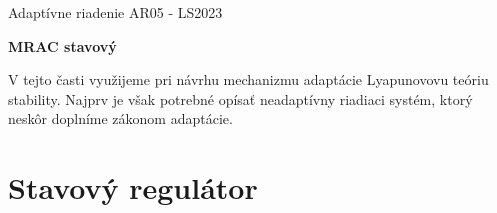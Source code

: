 \documentclass[a4paper, 10pt, ]{article}
\def\oznacenieCasti{AR05 - LS2023}
\begin{document}
\lstset{%
style=mystyle,
rangebeginprefix=\#\#\#\ cellB\ ,%
rangebeginsuffix=\ \#\#\#,%
rangeendprefix=\#\#\#\ cellE\ ,%
rangeendsuffix=\ \#\#\#,%
includerangemarker=false,
}




\fontsize{12pt}{22pt}\selectfont

\centerline{\textsf{Adaptívne riadenie} \hfill \textsf{\oznacenieCasti}}

\fontsize{18pt}{22pt}\selectfont








\begin{flushleft}
    \textbf{\textsf{MRAC stavový}}
\end{flushleft}







\normalsize

\bigskip

{\hypersetup{hidelinks}

\tableofcontents

}

\bigskip

\vspace{18pt}






\noindent
\lettrine[lines=3, nindent=0pt]{V}{} tejto časti využijeme pri návrhu mechanizmu adaptácie Lyapunovovu teóriu stability. Najprv je však potrebné opísať neadaptívny riadiaci systém, ktorý neskôr doplníme zákonom adaptácie.












\section{Stavový regulátor}
\label{Stavový regulátor ($n=2$)}
\end{document}

